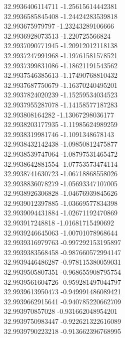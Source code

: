 {32.9936406114711	-1.25615614442381\\
32.9936585845408	-1.24424283539818\\
32.993675979797	-1.23243289106666\\
32.9936928073513	-1.220725566824\\
32.9937090771945	-1.20912012118138\\
32.9937247991968	-1.19761581578521\\
32.9937399831086	-1.18621191543562\\
32.9937546385613	-1.17490768810432\\
32.9937687750679	-1.16370240495201\\
32.9937824020239	-1.15259534034523\\
32.9937955287078	-1.14158577187283\\
32.993808164282	-1.13067298036177\\
32.9938203177935	-1.11985624989259\\
32.9938319981746	-1.1091348678143\\
32.9938432142438	-1.09850812475877\\
32.9938539747064	-1.08797531465472\\
32.9938642881554	-1.07753573474114\\
32.9938741630723	-1.06718868558026\\
32.9938836078279	-1.05693347107005\\
32.9938926306828	-1.04676939845626\\
32.9939012397885	-1.03669577834398\\
32.9939094431884	-1.02671192470869\\
32.993917248818	-1.01681715490692\\
32.9939246645063	-1.00701078968644\\
32.9939316979763	-0.997292153195897\\
32.9939383568458	-0.987660572994147\\
32.9939446486287	-0.978115380059031\\
32.9939505807351	-0.968655908795754\\
32.9939561604726	-0.959281497044797\\
32.9939613950473	-0.949991486089421\\
32.9939662915641	-0.940785220662709\\
32.993970857028	-0.931662048954201\\
32.9939750983447	-0.922621322616089\\
32.9939790223218	-0.913662396768995\\
}
